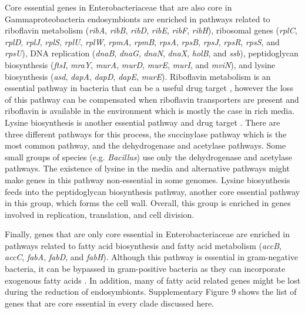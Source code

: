\documentclass[12pt,letterpaper]{article}
\begin{document}
Core essential genes in Enterobacteriaceae that are also core in Gammaproteobacteria endosymbionts are enriched in pathways related to riboflavin metabolism (\textit{ribA}, \textit{ribB}, \textit{ribD}, \textit{ribE}, \textit{ribF}, \textit{ribH}), ribosomal genes (\textit{rplC}, \textit{rplD}, \textit{rplJ}, \textit{rplS}, \textit{rplU}, \textit{rplW}, \textit{rpmA}, \textit{rpmB}, \textit{rpsA}, \textit{rpsB}, \textit{rpsJ}, \textit{rpsR}, \textit{rpsS}, and \textit{rpsU}), DNA replication (\textit{dnaB}, \textit{dnaG}, \textit{dnaN}, \textit{dnaX}, \textit{holB}, and \textit{ssb}), peptidoglycan biosynthesis (\textit{ftsI}, \textit{mraY}, \textit{murA}, \textit{murD}, \textit{murE}, \textit{murI}, and \textit{mviN}), and lysine biosynthesis (\textit{asd}, \textit{dapA}, \textit{dapD}, \textit{dapE}, \textit{murE}). Riboflavin metabolism is an essential pathway in bacteria that can be a useful drug target \cite{long_riboflavin_2010}, however the loss of this pathway can be compensated when riboflavin transporters are present and riboflavin is available in the environment \cite{gutierrez-preciado_extensive_2015} which is mostly the case in rich media. Lysine biosynthesis is another essential pathway and drug target \cite{gillner_lysine_2013, hutton_inhibition_2007}. There are three different pathways for this process, the succinylase pathway which is the most common pathway, and the dehydrogenase and acetylase pathways. Some small groups of species (e.g. \textit{Bacillus}) use only the dehydrogenase and acetylase pathways. The existence of lysine in the media and alternative pathways might make genes in this pathway non-essential in some genomes. Lysine biosynthesis feeds into the peptidoglycan biosynthesis pathway, another core essential pathway in this group,  which forms the cell wall. Overall, this group is enriched in genes involved in replication, translation, and cell division.

Finally, genes that are only core essential in Enterobacteriaceae are enriched in pathways related to fatty acid biosynthesis and fatty acid metabolism (\textit{accB}, \textit{accC}, \textit{fabA}, \textit{fabD}, and \textit{fabH}). Although this pathway is essential in gram-negative bacteria, it can be bypassed in gram-positive bacteria as they can incorporate exogenous fatty acids \cite{parsons_identification_2014, parsons_incorporation_2014}. In addition, many of fatty acid related genes might be lost during the reduction of endosymbionts. Supplementary Figure 9 shows the list of genes that are core essential in every clade discussed here.
\end{document}
